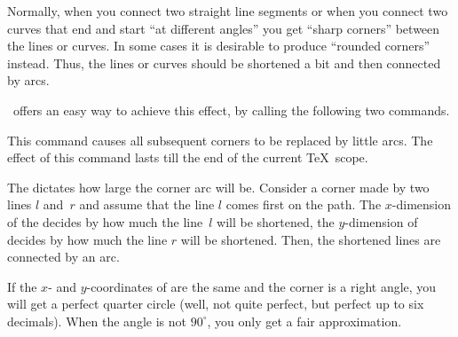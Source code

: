 Normally, when you connect two straight line segments or when you
connect two curves that end and start ``at different angles'' you get
``sharp corners'' between the lines or curves. In some cases it is
desirable to produce ``rounded corners'' instead. Thus, the lines
or curves should be shortened a bit and then connected by arcs.

\pgfname\ offers an easy way to achieve this effect, by calling the
following two commands.

\begin{command}{\pgfsetcornersarced{}}
  This command causes all subsequent corners to be replaced by little
  arcs. The effect of this command lasts till the end of the current
  \TeX\ scope.

  The  dictates how large the corner arc will be. Consider
  a corner made by two lines $l$ and~$r$ and assume that the line $l$
  comes first on the path. The $x$-dimension of the 
  decides by how much the line~$l$ will be shortened, the
  $y$-dimension of  decides by how much the line $r$ will
  be shortened. Then, the shortened lines are connected by an arc.

\begin{codeexample}[]
\end{codeexample}

\begin{codeexample}[]
\end{codeexample}

  If the $x$- and $y$-coordinates of  are the same and the
  corner is a right angle, you will get a perfect quarter circle
  (well, not quite perfect, but perfect up to six decimals). When the
  angle is not $90^\circ$, you only get a fair approximation.


\end{command}
